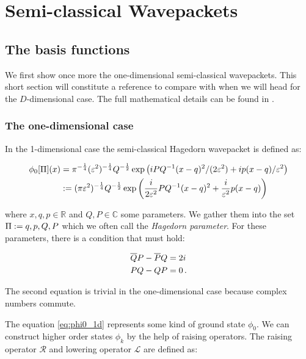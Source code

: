 \chapter{Semi-classical Wavepackets}
\label{ch:wavepackets}


\section{The basis functions}


We first show once more the one-dimensional semi-classical wavepackets.
This short section will constitute a reference to compare with when
we will head for the $D$-dimensional case. The full mathematical details
can be found in \cite{H_ladder_operators}.


\subsection{The one-dimensional case}


In the 1-dimensional case the semi-classical Hagedorn wavepacket is defined as:

\begin{align} \label{eq:phi0_1d}
  \phi_0[\Pi](x) & = \pi^{-\frac{1}{4}} (\varepsilon^2)^{-\frac{1}{4}} Q^{-\frac{1}{2}}
                     \exp \left( i PQ{}^{-1} (x-q)^2 / (2\varepsilon^2) + i p (x-q) / \varepsilon^2 \right) \\
                 & := (\pi\varepsilon^2)^{-\frac{1}{4}} Q^{-\frac{1}{2}}
                           \exp \left( \frac{i}{2\varepsilon^2} PQ{}^{-1} (x-q)^2 + \frac{i}{\varepsilon^2} p (x-q) \right)
\end{align}

where $x, q, p \in \mathbb{R}$ and $Q, P \in \mathbb{C}$ some parameters. We gather
them into the set $\Pi := {q,p,Q,P}$ which we often call the \emph{Hagedorn parameter}.
For these parameters, there is a condition that must hold:

\begin{align} \label{eq:PQcond_1d}
  \overline{Q} P - \overline{P} Q & = 2i \\
  P Q - Q P & = 0 \,.
\end{align}

The second equation is trivial in the one-dimensional case because complex numbers
commute.

The equation \eqref{eq:phi0_1d} represents some kind of ground state $\phi_0$. We
can construct higher order states $\phi_k$ by the help of raising operators. The
raising operator $\mathcal{R}$ and lowering operator $\mathcal{L}$ are defined
as:

